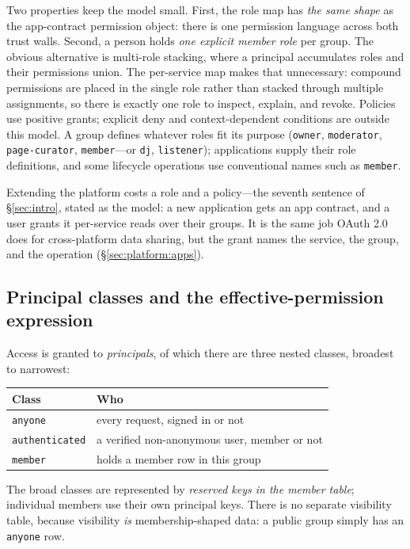 \documentclass[sigconf, nonacm]{acmart}
\begin{document}
Two properties keep the model small. First, the role map has \emph{the same
shape} as the app-contract permission object: there is one permission
language across both trust walls. Second, a person holds \emph{one explicit
member role} per group. The obvious alternative is multi-role stacking, where
a principal accumulates roles and their permissions union. The per-service
map makes that unnecessary: compound permissions are placed in the single
role rather than stacked through multiple assignments, so there is exactly
one role to inspect, explain, and revoke. Policies use positive grants;
explicit deny and context-dependent conditions are outside this model. A
group defines whatever roles fit its purpose (\texttt{owner},
\texttt{moderator}, \texttt{page-curator}, \texttt{member}---or
\texttt{dj}, \texttt{listener}); applications supply their role definitions,
and some lifecycle operations use conventional names such as \texttt{member}.

Extending the platform costs a role and a policy---the seventh sentence of
\S\ref{sec:intro}, stated as the model: a new application gets an app
contract, and a user grants it per-service reads over their groups. It is
the same job OAuth 2.0 does for cross-platform data sharing, but the grant
names the service, the group, and the operation (\S\ref{sec:platform:apps}).

\subsection{Principal classes and the effective-permission expression}

Access is granted to \emph{principals}, of which there are three nested
classes, broadest to narrowest:

\begin{center}
\small
\begin{tabular}{ll}
\toprule
\textbf{Class} & \textbf{Who} \\
\midrule
\texttt{anyone}        & every request, signed in or not \\
\texttt{authenticated} & a verified non-anonymous user, member or not \\
\texttt{member}        & holds a member row in this group \\
\bottomrule
\end{tabular}
\end{center}

The broad classes are represented by \emph{reserved keys in the member
table}; individual members use their own principal keys. There is no separate
visibility table, because visibility \emph{is} membership-shaped data: a
public group simply has an \texttt{anyone} row.
\end{document}
